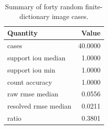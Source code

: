 \begin{table}[htbp]\centering
\caption{Summary of forty random finite-dictionary image cases.}\label{tab:two-d-random}
\begin{tabular}{lr}\toprule
Quantity & Value\\\midrule
cases & 40.0000\\
support iou median & 1.0000\\
support iou min & 1.0000\\
count accuracy & 1.0000\\
raw rmse median & 0.0556\\
resolved rmse median & 0.0211\\
ratio & 0.3801\\
\bottomrule\end{tabular}\end{table}